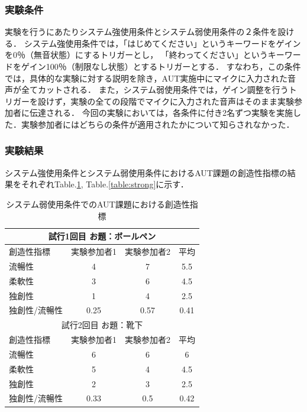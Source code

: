 \documentclass[a4paper]{jarticle}
\begin{document}
\subsubsection{実験条件}
実験を行うにあたりシステム強使用条件とシステム弱使用条件の２条件を設ける．
システム強使用条件では，「はじめてください」というキーワードをゲインを0％（無音状態）にするトリガーとし，
「終わってください」というキーワードをゲイン100％（制限なし状態）とするトリガーとする．
すなわち，この条件では，具体的な実験に対する説明を除き，AUT実施中にマイクに入力された音声が全てカットされる．
また，システム弱使用条件では，ゲイン調整を行うトリガーを設けず，実験の全ての段階でマイクに入力された音声はそのまま実験参加者に伝達される．
今回の実験においては，各条件に付き2名ずつ実験を実施した．実験参加者にはどちらの条件が適用されたかについて知らされなかった．

\subsubsection{実験結果}
システム強使用条件とシステム弱使用条件におけるAUT課題の創造性指標の結果をそれぞれTable.\ref{table:week}, Table.\ref{table:strong}に示す．
\begin{table}[htbp]
    \caption{システム弱使用条件でのAUT課題における創造性指標}
    \label{table:week}
    \centering
    \begin{tabular}{lccc}
      \hline
      \multicolumn{4}{c}{試行1回目 お題：ボールペン} \\
      \hline
      創造性指標  & 実験参加者1  &  実験参加者2  &  平均 \\
      \hline
      流暢性  & 4  & 7 & 5.5 \\
      柔軟性  & 3   & 6  & 4.5 \\
      独創性  & 1  & 4 & 2.5 \\
      独創性/流暢性  & 0.25 & 0.57 & 0.41 \\
      \hline
      \multicolumn{4}{c}{試行2回目 お題：靴下} \\
      \hline
      創造性指標  & 実験参加者1  &  実験参加者2  &  平均 \\
      \hline
      流暢性  & 6  & 6 & 6 \\
      柔軟性  & 5   & 4  & 4.5 \\
      独創性  & 2  & 3 & 2.5 \\
      独創性/流暢性  & 0.33 & 0.5 & 0.42 \\
      \hline
    \end{tabular}
  \end{table}
\end{document}
